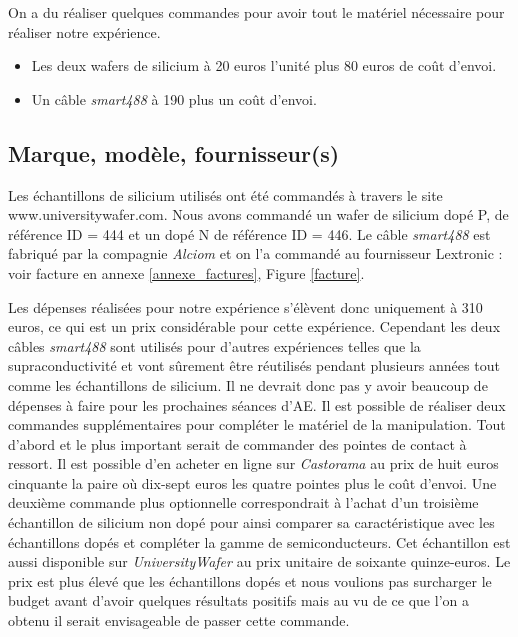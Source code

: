 \bigskip
On a du réaliser quelques commandes pour avoir tout le matériel nécessaire pour réaliser notre expérience.

\begin{itemize}
  \item Les deux wafers de silicium à 20 euros l'unité plus 80 euros de coût d'envoi.
  \item Un câble \emph{smart488} à 190 plus un coût d'envoi.
\end{itemize}

\subsection{Marque, modèle, fournisseur(s)}
Les échantillons de silicium utilisés ont été commandés à travers le site www.universitywafer.com. Nous avons commandé un wafer de silicium dopé P, de référence ID = 444  et un dopé N de référence ID = 446. Le câble \emph{smart488} est fabriqué par la compagnie \emph{Alciom} et on l'a commandé au fournisseur Lextronic : voir facture en annexe \ref{annexe_factures}, Figure \ref{facture}.

Les dépenses réalisées pour notre expérience s'élèvent donc uniquement à 310 euros, ce qui est un prix considérable pour cette expérience. Cependant les deux câbles \emph{smart488} sont utilisés pour d'autres expériences telles que la supraconductivité et vont sûrement être réutilisés pendant plusieurs années tout comme les échantillons de silicium. Il ne devrait donc pas y avoir beaucoup de dépenses à faire pour les prochaines séances d'AE.
Il est possible de réaliser deux commandes supplémentaires pour compléter le matériel de la manipulation.
Tout d'abord et le plus important serait de commander des pointes de contact à ressort. Il est possible d'en acheter en ligne sur \emph{Castorama} au prix de huit euros cinquante la paire où dix-sept euros les quatre pointes plus le coût d'envoi.
Une deuxième commande plus optionnelle correspondrait à l'achat d'un troisième échantillon de silicium non dopé pour ainsi comparer sa caractéristique avec les échantillons dopés et compléter la gamme de semiconducteurs. Cet échantillon est aussi disponible sur \emph{UniversityWafer} au prix unitaire de soixante quinze-euros. Le prix est plus élevé que les échantillons dopés et nous voulions pas surcharger le budget avant d'avoir quelques résultats positifs mais au vu de ce que l'on a obtenu il serait envisageable de passer cette commande.

